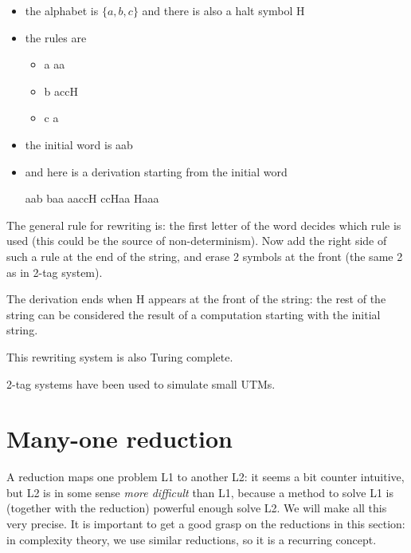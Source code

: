 \begin{itemize}
\item the alphabet is $\{a,b,c\}$ and there is also a halt symbol H
\item the rules are
\begin{itemize}
\item a \rpijl aa
\item b \rpijl accH
\item c \rpijl a
\end{itemize}

\item the initial word is aab
\item and here is a derivation starting from the initial word

aab \rpijl baa \rpijl aaccH \rpijl ccHaa \rpijl Haaa
\end{itemize}

The general rule for rewriting is: the first letter of the word
decides which rule is used (this could be the source of
non-determinism). Now add the right side of such a rule at the end of
the string, and erase 2 symbols at the front (the same 2 as in 2-tag
system).

The derivation ends when H appears at the front of the string: the
rest of the string can be considered the result of a computation
starting with the initial string.

This rewriting system is also Turing complete.


2-tag systems have been used to simulate small UTMs.


\clearpage
\section{Many-one reduction}\label{mappingreduction}

A reduction maps one problem L1 to another L2: it seems a bit counter
intuitive, but L2 is in some sense {\em more difficult} than L1,
because a method to solve L1 is (together with the reduction) powerful
enough solve L2. We will make all this very precise. It is important
to get a good grasp on the reductions in this section: in complexity
theory, we use similar reductions, so it is a recurring concept.

%

